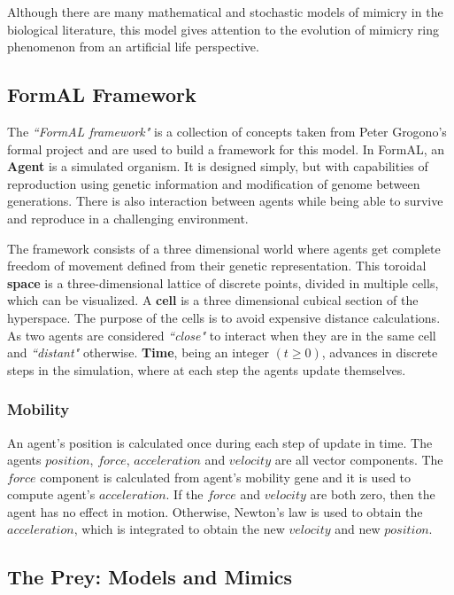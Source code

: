 \documentclass[letterpaper]{article}
\numberwithin{equation}{section}
\begin{document}
Although there are many mathematical and stochastic models of mimicry in the biological literature, this model gives attention to the evolution of mimicry ring phenomenon from an artificial life perspective.

\subsection{FormAL Framework}
The \textsl{``FormAL framework"} is a collection of concepts taken from Peter Grogono's \gls{formal} project \citep{grogono2003} and are used to build a framework for this model. In FormAL, an \textbf{Agent} is a simulated organism. It is designed simply, but with capabilities of reproduction using genetic information and modification of genome between generations. There is also interaction between agents while being able to survive and reproduce in a challenging environment.

The framework consists of a three dimensional world where agents get complete freedom of movement defined from their genetic representation. This toroidal \textbf{space} is a three-dimensional lattice of discrete points, divided in multiple cells, which can be visualized. A \textbf{cell} is a three dimensional cubical section of the hyperspace. The purpose of the cells is to avoid expensive distance calculations. As two agents are considered \textsl{``close"} to interact when they are in the same cell and \textsl{``distant"} otherwise. \textbf{Time}, being an integer \( (t \geq 0) \), advances in discrete steps in the simulation, where at each step the agents update themselves.

\subsubsection{Mobility}
An agent's position is calculated once during each step of update in time. The agents \(position\), \(force\), \(acceleration\) and \(velocity\) are all vector components. The \(force\) component is calculated from agent's mobility gene and it is used to compute agent's \(acceleration\). If the \(force\) and \(velocity\) are both zero, then the agent has no effect in motion. Otherwise, Newton's law is used to obtain the \(acceleration\), which is integrated to obtain the new \(velocity\) and new \(position\).

\subsection{The Prey: Models and Mimics}
\end{document}
